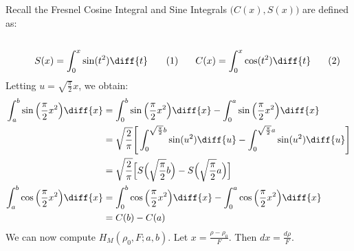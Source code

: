 \documentclass[crop=false,class=book,oneside]{standalone}
\begin{document}
            Recall the Fresnel Cosine Integral and
            Sine Integrals $\big(C(x),S(x)\big)$ are defined as:
            \par
            \begin{subequations}
                \begin{minipage}[b]{0.49\textwidth}
                    \begin{equation}
                        S(x)=\int_{0}^{x}\sin(t^{2})\diff{t}
                    \end{equation}
                \end{minipage}
                \hfill
                \begin{minipage}[b]{0.49\textwidth}
                    \begin{equation}
                        C(x)=\int_{0}^{x}\cos(t^{2})\diff{t}
                    \end{equation}
                \end{minipage}
            \end{subequations}
            Letting $u=\sqrt{\frac{\pi}{2}}x$, we obtain:
            \begin{subequations}
                \begin{align}
                    \int_{a}^{b}\sin\Big(\frac{\pi}{2}x^{2}\Big)\diff{x}
                    &=\int_{0}^{b}\sin\Big(\frac{\pi}{2}x^{2}\Big)\diff{x}-
                        \int_{0}^{a}\sin\Big(\frac{\pi}{2}x^{2}\Big)\diff{x}\\
                    &=\sqrt{\frac{2}{\pi}}\Bigg[
                        \int_{0}^{\sqrt{\frac{\pi}{2}}b}\sin(u^{2})\diff{u}-
                        \int_{0}^{\sqrt{\frac{\pi}{2}}a}\sin(u^{2})\diff{u}
                    \Bigg]\\
                    &=\sqrt{\frac{2}{\pi}}\Big[
                        S\Big(\sqrt{\frac{\pi}{2}}b\Big)-
                        S\Big(\sqrt{\frac{\pi}{2}}a\Big)
                    \Big]\\
                        \int_{a}^{b}\cos\Big(\frac{\pi}{2}x^{2}\Big)\diff{x}
                    &=\int_{0}^{b}\cos\Big(\frac{\pi}{2}x^{2}\Big)\diff{x}-
                        \int_{0}^{a}\cos\Big(\frac{\pi}{2}x^{2}\Big)\diff{x}\\
                    &=C(b)-C(a)
                \end{align}
            \end{subequations}
            We can now compute
            $H_{M}(\rho_0,F;a,b)$.
            Let $x=\frac{\rho-\rho_0}{F}$. Then $dx = \frac{d\rho}{F}$.
\end{document}
